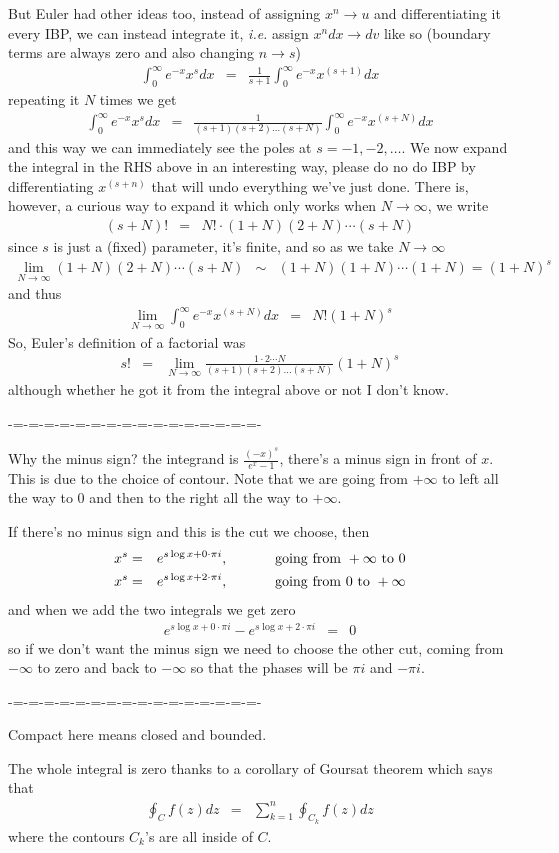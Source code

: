 \documentclass[aps,preprint,preprintnumbers,nofootinbib,showpacs,prd]{revtex4-1}
\newcommand{\ie}{{\it i.e.} }
\newcommand{\nbea}{\begin{eqnarray*}}
\newcommand{\neea}{\end{eqnarray*}}
\begin{document}
But Euler had other ideas too, instead of assigning $x^n \to u$ and differentiating it every IBP, we can instead integrate it, \ie assign $x^n dx \to dv$ like so (boundary terms are always zero and also changing $n\to s$)
%
\nbea
\int_0^\infty e^{-x} x^s dx & = & \frac{1}{s+1} \int_0^\infty e^{-x} x^{(s+1)} dx
\neea
%
repeating it $N$ times we get
%
\nbea
\int_0^\infty e^{-x} x^s dx & = & \frac{1}{(s+1)(s+2) \dots (s+N)} \int_0^\infty e^{-x} x^{(s+N)} dx
\neea
%
and this way we can immediately see the poles at $s = -1, -2, \dots$. We now expand the integral in the RHS above in an interesting way, please do no do IBP by differentiating $x^{(s+n)}$ that will undo everything we've just done. There is, however, a curious way to expand it which only works when $N\to\infty$, we write
%
\nbea
(s + N)! & = & N! \cdot (1 + N)(2 + N) \cdots (s+N)
\neea
%
since $s$ is just a (fixed) parameter, it's finite, and so as we take $N\to\infty$
%
\nbea
\lim_{N\to\infty} (1 + N)(2 + N) \cdots (s+N) & \sim & (1 + N)(1 + N) \cdots (1+N) = (1+N)^s
\neea
%
and thus
%
\nbea
\lim_{N\to\infty}\int_0^\infty e^{-x} x^{(s+N)} dx & = & N! (1+N)^s
\neea
%
So, Euler's definition of a factorial was
%
\nbea
s! & = & \lim_{N\to\infty} \frac{1\cdot2\cdots N}{(s+1)(s+2) \dots (s+N)} (1+N)^s
\neea
%
although whether he got it from the integral above or not I don't know.

-=-=-=-=-=-=-=-=-=-=-=-=-=-=-=-=-

Why the minus sign? the integrand is $\frac{(-x)^s}{e^x - 1}$, there's a minus sign in front of $x$. This is due to the choice of contour. Note that we are going from $+\infty$ to left all the way to 0 and then to the right all the way to $+\infty$.

If there's no minus sign and this is the cut we choose, then
%
\nbea
x^s & = & e^{s\log x + 0\cdot\pi i} , ~~~~~~~~~~ {\rm going~from~} +\infty {\rm ~to~} 0 \\
x^s & = & e^{s\log x + 2\cdot\pi i} , ~~~~~~~~~~ {\rm going~from~} 0 {\rm ~to~} +\infty
\neea
% 
and when we add the two integrals we get zero
%
\nbea
e^{s\log x + 0\cdot\pi i} - e^{s\log x + 2\cdot\pi i} & = & 0
\neea
%
so if we don't want the minus sign we need to choose the other cut, coming from $-\infty$ to zero and back to $-\infty$ so that the phases will be $\pi i$ and $-\pi i$.

-=-=-=-=-=-=-=-=-=-=-=-=-=-=-=-=-

Compact here means closed and bounded.

The whole integral is zero thanks to a corollary of Goursat theorem which says that
%
\nbea
\oint_C f(z) dz & = & \sum_{k=1}^n \oint_{C_k} f(z) dz
\neea
%
where the contours $C_k$'s are all inside of $C$.
\end{document}
